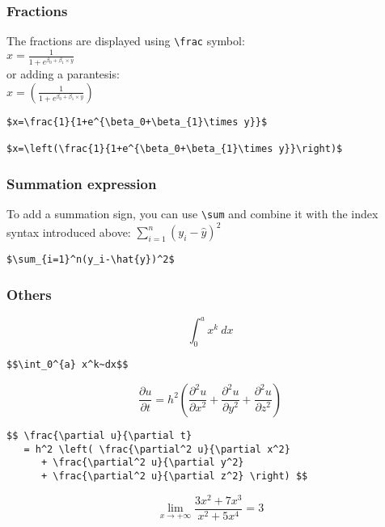 \documentclass[]{article}
\begin{document}
\subsubsection{Fractions}\label{fractions}

The fractions are displayed using \texttt{\textbackslash{}frac}
symbol:\\
\(x=\frac{1}{1+e^{\beta_0+\beta_{1}\times y}}\)\\
or adding a parantesis:\\
\(x=\left(\frac{1}{1+e^{\beta_0+\beta_{1}\times y}}\right)\)

\begin{verbatim}
$x=\frac{1}{1+e^{\beta_0+\beta_{1}\times y}}$   

$x=\left(\frac{1}{1+e^{\beta_0+\beta_{1}\times y}}\right)$
\end{verbatim}

\subsubsection{Summation expression}\label{summation-expression}

To add a summation sign, you can use \texttt{\textbackslash{}sum} and
combine it with the index syntax introduced above:
\(\sum_{i=1}^n(y_i-\hat{y})^2\)

\begin{verbatim}
$\sum_{i=1}^n(y_i-\hat{y})^2$
\end{verbatim}

\subsubsection{Others}\label{others}

\[\int_0^{a} x^k~dx\]

\begin{verbatim}
$$\int_0^{a} x^k~dx$$
\end{verbatim}

\[ \frac{\partial u}{\partial t}
   = h^2 \left( \frac{\partial^2 u}{\partial x^2}
      + \frac{\partial^2 u}{\partial y^2}
      + \frac{\partial^2 u}{\partial z^2} \right) \]

\begin{verbatim}
$$ \frac{\partial u}{\partial t}
   = h^2 \left( \frac{\partial^2 u}{\partial x^2}
      + \frac{\partial^2 u}{\partial y^2}
      + \frac{\partial^2 u}{\partial z^2} \right) $$
\end{verbatim}

\[\lim_{x \to +\infty} \frac{3x^2 +7x^3}{x^2 +5x^4} = 3\]
\end{document}
